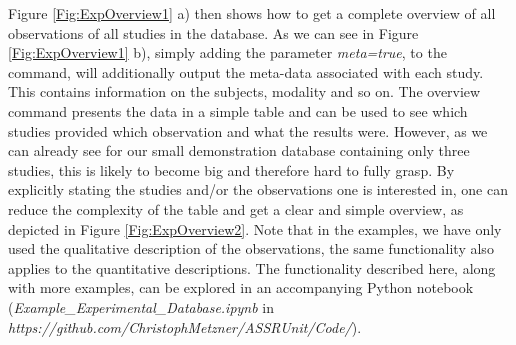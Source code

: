 \documentclass[a4paper,10pt]{article}
\begin{document}
Figure \ref{Fig:ExpOverview1} a) then shows how to get a complete overview of all observations of all studies in the database. As we can see in Figure \ref{Fig:ExpOverview1} b), simply adding the parameter \textit{meta=true},
to the command, will additionally output the meta-data associated with each study. This contains information on the subjects, modality and so on.
The overview command presents the data in a simple table and can be used to see which studies provided 
which observation and what the results were. However, as we can already see for our small demonstration database containing only three studies, this is likely to become big and therefore hard to fully grasp.
By explicitly stating the studies and/or the observations one is interested in, one can reduce the complexity of the table and get a clear and simple overview, as depicted in Figure \ref{Fig:ExpOverview2}. Note that in the
examples, we have only used the qualitative description of the observations, the same functionality also applies to the quantitative descriptions. The functionality described here, along with
more examples, can be explored in an accompanying Python notebook (\textit{Example\_Experimental\_Database.ipynb} in \textit{https://github.com/ChristophMetzner/ASSRUnit/Code/}).
\end{document}
